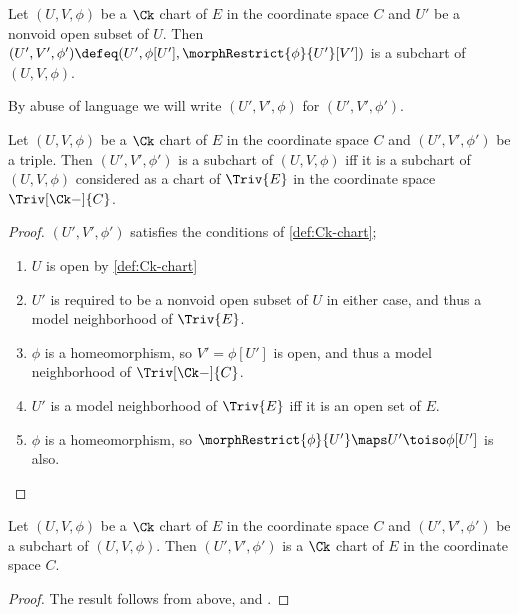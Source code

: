 \documentclass{article}
\begin{document}
\begin{definition}
\label{def:Ck-subchart}
Let $(U, V, \phi)$ be a $\Ck$ chart of $E$ in the coordinate space $C$
and $U'$ be a nonvoid open subset of $U$. Then
$(U', V', \phi') \defeq (U', \phi[U'], \morphRestrict{\phi}{U'}[V'])$
is a subchart of $(U, V, \phi)$.

By abuse of language we will write $(U', V', \phi)$ for
$(U', V', \phi')$.
\end{definition}

\begin{lemma}
\label{lem:Ck-subchart}
Let $(U, V, \phi)$ be a $\Ck$ chart of $E$ in the coordinate space $C$
and $(U', V', \phi')$ be a triple. Then $(U', V', \phi')$ is a subchart
of $(U, V, \phi)$ iff it is a subchart of $(U, V, \phi)$ considered as a
chart of $\Triv{E}$ in the coordinate space $\Triv[\Ck-]{C}$.

\begin{proof}
$(U',V',\phi')$ satisfies the conditions of \cref{def:Ck-chart};
\begin{enumerate}
\item
$U$ is open by \cref{def:Ck-chart}
\item
$U'$ is required to be a nonvoid open subset of $U$ in either case,
and thus a model neighborhood of $\Triv{E}$.
\item
$\phi$ is a homeomorphism, so $V'=\phi[U']$ is open,
and thus a model neighborhood of $\Triv[\Ck-]{C}$.
\item
$U'$ is a model neighborhood of $\Triv{E}$ iff it is an open set of $E$.
\item
$\phi$ is a homeomorphism, so
$\morphRestrict{\phi}{U'} \maps U' \toiso \phi[U']$ is also.
\end{enumerate}
\end{proof}
\end{lemma}

\begin{corollary}
\label{cor:Ck-subchart}
Let $(U, V, \phi)$ be a $\Ck$ chart of $E$ in the coordinate space $C$
and $(U', V', \phi')$ be a subchart of $(U, V, \phi)$. Then
$(U', V', \phi')$ is a $\Ck$ chart of $E$ in the coordinate space $C$.

\begin{proof}
The result follows from  above,
{
  \showlabelsinline
}
and .
\end{proof}
\end{corollary}
\end{document}
